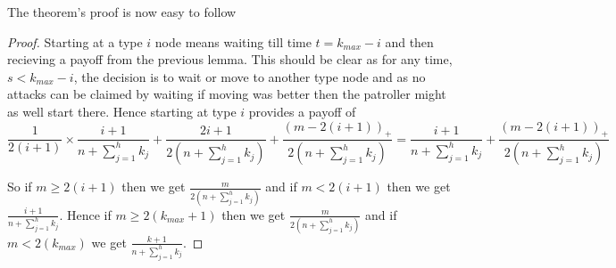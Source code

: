 \documentclass[a4paper,10pt]{article}
\newcommand{\denominator}{\ensuremath{n+\sum\limits_{j=1}^{h} k_{j}}}
\newcommand{\pospart}[1]{\left( #1 \right)_{+}}
\theoremstyle{definition}
\theoremstyle{definition}
\theoremstyle{remark}
\theoremstyle{definition}
\begin{document}
The theorem's proof is now easy to follow

\begin{proof}
Starting at a type $i$ node means waiting till time $t=k_{max}-i$ and then recieving a payoff from the previous lemma. This should be clear as for any time, $s < k_{max}-i$, the decision is to wait or move to another type node and as no attacks can be claimed by waiting if moving was better then the patroller might as well start there.
Hence starting at type $i$ provides a payoff of
$$\frac{1}{2(i+1)} \times \frac{i+1}{\denominator} + \frac{2i+1}{2 \left( \denominator \right)} +\frac{\pospart{m-2(i+1)}}{2 \left( \denominator \right)}=\frac{i+1}{\denominator} +\frac{\pospart{m-2(i+1)}}{2 \left( \denominator \right)}$$

So if $m \geq 2(i+1)$ then we get $\frac{m}{2 \left( \denominator \right)}$ and if $m < 2(i+1)$ then we get $\frac{i+1}{\denominator}$. 
Hence if $m \geq 2(k_{max}+1)$ then we get $\frac{m}{2 \left( \denominator \right)}$ and if $m < 2(k_{max})$ we get $\frac{k+1}{\denominator}$.
\end{proof}
\end{document}
